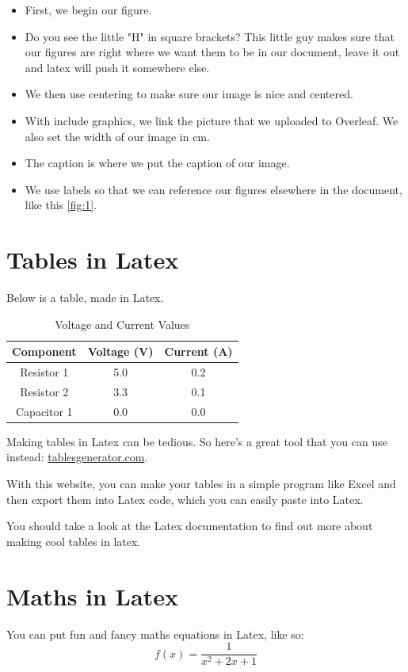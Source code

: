 \documentclass[11pt]{article}
\begin{document}
\begin{itemize}
  \item First, we begin our figure.
  \item Do you see the little "H" in square brackets? This little guy makes sure that our figures are right where we want them to be in our document, leave it out and latex will push it somewhere else.
  \item We then use centering to make sure our image is nice and centered.
  \item With include graphics, we link the picture that we uploaded to Overleaf. We also set the width of our image in cm.
  \item The caption is where we put the caption of our image.
  \item We use labels so that we can reference our figures elsewhere in the document, like this \ref{fig:1}.
\end{itemize}
\section{Tables in Latex}
Below is a table, made in Latex.
\begin{table}[h]
  \centering
  \caption{Voltage and Current Values}
  \begin{tabular}{|c|c|c|}
    \hline
    Component & Voltage (V) & Current (A) \\
    \hline
    Resistor 1 & 5.0 & 0.2 \\
    Resistor 2 & 3.3 & 0.1 \\
    Capacitor 1 & 0.0 & 0.0 \\
    \hline
  \end{tabular}
\end{table}

Making tables in Latex can be tedious. So here's a great tool that you can use instead: \href{https://www.tablesgenerator.com/}{tablesgenerator.com}.

With this website, you can make your tables in a simple program like Excel and then export them into Latex code, which you can easily paste into Latex.

You should take a look at the Latex documentation to find out more about making cool tables in latex.

\section{Maths in Latex}
You can put fun and fancy maths equations in Latex, like so:
\begin{equation}
    f(x) = \frac{1}{x^2 + 2x + 1}
\end{equation}
\end{document}

